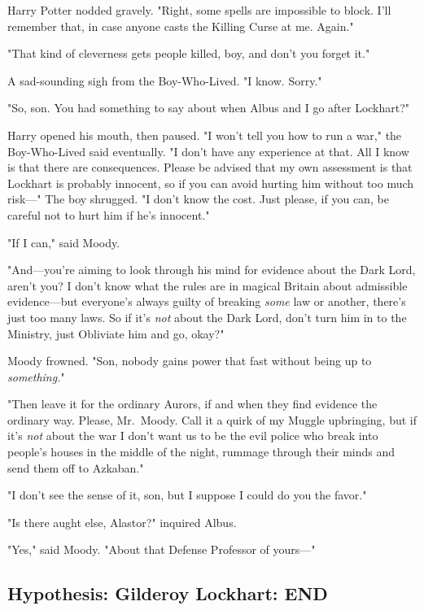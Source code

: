 Harry Potter nodded gravely. "Right, some spells are impossible to block. I'll
remember that, in case anyone casts the Killing Curse at me. Again."

"That kind of cleverness gets people killed, boy, and don't you forget it."

A sad-sounding sigh from the Boy-Who-Lived. "I know. Sorry."

"So, son. You had something to say about when Albus and I go after Lockhart?"

Harry opened his mouth, then paused. "I won't tell you how to run a war," the
Boy-Who-Lived said eventually. "I don't have any experience at that. All I know
is that there are consequences. Please be advised that my own assessment is
that Lockhart is probably innocent, so if you can avoid hurting him without too
much risk---" The boy shrugged. "I don't know the cost. Just please, if you
can, be careful not to hurt him if he's innocent."

"If I can," said Moody.

"And---you're aiming to look through his mind for evidence about the Dark Lord,
aren't you? I don't know what the rules are in magical Britain about admissible
evidence---but everyone's always guilty of breaking \emph{some} law or another,
there's just too many laws. So if it's \emph{not} about the Dark Lord, don't
turn him in to the Ministry, just Obliviate him and go, okay?"

Moody frowned. "Son, nobody gains power that fast without being up to
\emph{something.}"

"Then leave it for the ordinary Aurors, if and when they find evidence the
ordinary way. Please, Mr.~Moody. Call it a quirk of my Muggle upbringing, but
if it's \emph{not} about the war I don't want us to be the evil police who
break into people's houses in the middle of the night, rummage through their
minds and send them off to Azkaban."

"I don't see the sense of it, son, but I suppose I could do you the favor."

"Is there aught else, Alastor?" inquired Albus.

"Yes," said Moody. "About that Defense Professor of yours---"
\sbreak
\vspace{-2\baselineskip}
\subsection{Hypothesis: Gilderoy Lockhart: END}
\sbreak
\vspace{-2\baselineskip}
